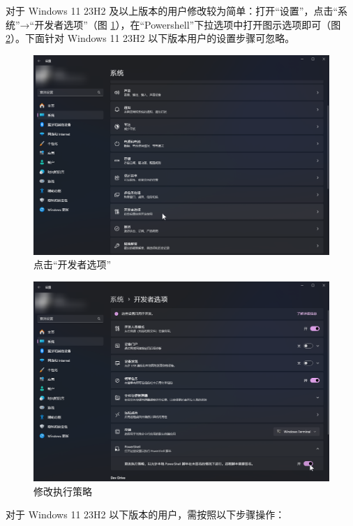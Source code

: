 对于 Windows 11 23H2 及以上版本的用户修改较为简单：打开“设置”，点击“系统”→“开发者选项”（图 \ref{ch0fig-win11-23h2-0}），在“Powershell”下拉选项中打开图示选项即可（图 \ref{ch0fig-win11-23h2-1}）。下面针对 Windows 11 23H2 以下版本用户的设置步骤可忽略。

\begin{figure}[H]
    \Centering
    \includegraphics[width=\textwidth]{docs/assets/intro/win11_23h2_00.png}
    \caption{点击“开发者选项”}
    \label{ch0fig-win11-23h2-0}
\end{figure}

\begin{figure}[H]
    \Centering
    \includegraphics[width=\textwidth]{docs/assets/intro/win11_23h2_01.png}
    \caption{修改执行策略}
    \label{ch0fig-win11-23h2-1}
\end{figure}

对于 Windows 11 23H2 以下版本的用户，需按照以下步骤操作：

